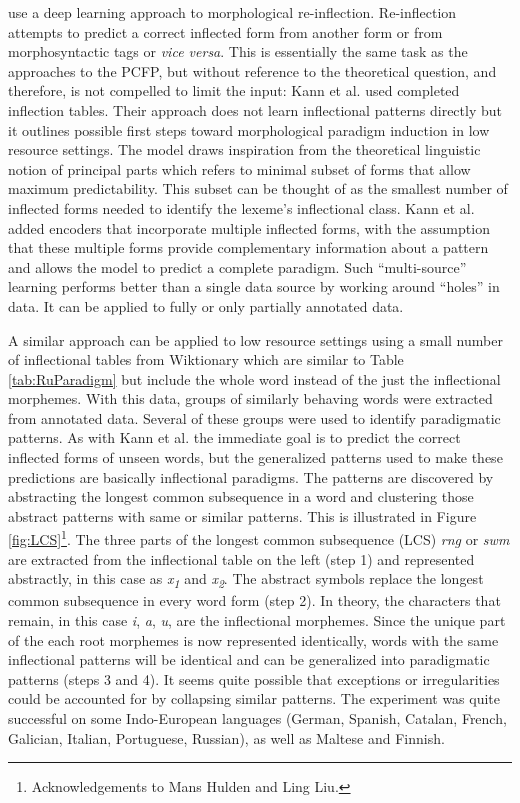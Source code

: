 \documentclass[12pt]{article}
\begin{document}
 use a deep learning approach to morphological re-inflection. Re-inflection attempts to predict a correct inflected form from another form or from morphosyntactic tags or \textit{vice versa}. This is essentially the same task as the approaches to the PCFP, but without reference to the theoretical question, and therefore, is not compelled to limit the input: Kann et al. used completed inflection tables. Their approach does not learn inflectional patterns directly but it outlines possible first steps toward morphological paradigm induction in low resource settings. The model draws inspiration from the theoretical linguistic notion of principal parts \cite{blevins2006word,finkel_principal_2007} which refers to minimal subset of forms that allow maximum predictability. This subset can be thought of as the smallest number of inflected forms needed to identify the lexeme's inflectional class. Kann et al. added encoders that incorporate multiple inflected forms, with the assumption that these multiple forms provide complementary information about a pattern and allows the model to predict a complete paradigm. Such ``multi-source'' learning performs better than a single data source by working around ``holes” in data. It can be applied to fully or only partially annotated data.

A similar approach can be applied to low resource settings \cite{ahlberg_semi-supervised_2014,ahlberg_paradigm_2015} using a small number of inflectional tables from Wiktionary which are similar to Table \ref{tab:RuParadigm} but include the whole word instead of the just the inflectional morphemes. With this data, groups of similarly behaving words were extracted from annotated data. Several of these groups were used to identify paradigmatic patterns.  As with Kann et al. the immediate goal is to predict the correct inflected forms of unseen words, but the generalized patterns used to make these predictions are basically inflectional paradigms. The patterns are discovered by abstracting the longest common subsequence in a word and clustering those abstract patterns with same or similar patterns. This is illustrated in Figure \ref{fig:LCS}\footnote{Acknowledgements to Mans Hulden and Ling Liu.}. The three parts of the longest common subsequence (LCS) \textit{rng} or \textit{swm} are extracted from the inflectional table on the left (step 1) and represented abstractly, in this case as \textit{x\textsubscript{1}} and \textit{x\textsubscript{2}}. The abstract symbols replace the longest common subsequence in every word form (step 2). In theory, the characters that remain, in this case \textit{i}, \textit{a}, \textit{u}, are the inflectional morphemes. Since the unique part of the each root morphemes is now represented identically, words with the same inflectional patterns will be identical and can be generalized into paradigmatic patterns (steps 3 and 4). It seems quite possible that exceptions or irregularities could be accounted for by collapsing similar patterns. The experiment was quite successful on some Indo-European languages (German, Spanish, Catalan, French, Galician, Italian, Portuguese, Russian), as well as Maltese and Finnish.
\end{document}
